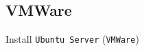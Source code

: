 \documentclass{beamer}
\begin{document}
\subsection{VMWare}
\begin{frame}{Install \texttt{Ubuntu Server} (\texttt{VMWare})}
  \begin{center}
    \begin{figure}
      \begin{overprint}
        \setlength{\fboxsep}{0pt}%
        \setlength{\fboxrule}{0.5pt}%
        \centering{}
        \centering{}
        \centering{}

\end{overprint}
\end{figure}
\end{center}
\end{frame}
\end{document}

